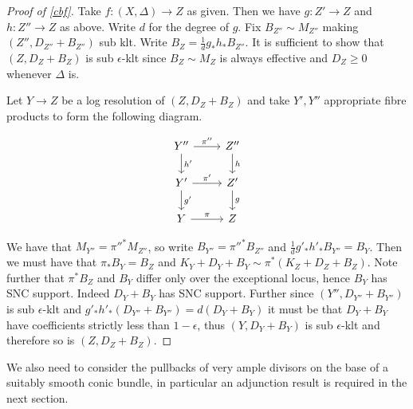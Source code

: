\begin{proof}[Proof of \autoref{cbf}]
	Take $f\colon (X,\Delta) \to Z$ as given. Then we have $g\colon Z' \to Z$ and $h\colon Z''\to Z$ as above. Write $d$ for the degree of $g$.
	Fix $B_{Z''}\sim M_{Z''}$ making $(Z'',D_{Z''}+B_{Z''})$ sub klt. Write $B_{Z}=\frac{1}{d}g_{*}h_{*}B_{Z''}$. It is sufficient to show that $(Z,D_{Z}+B_{Z})$ is sub $\epsilon$-klt since $B_{Z} \sim M_{Z}$ is always effective and $D_{Z} \geq 0$ whenever $\Delta$ is.
	
	Let $Y \to Z$ be a log resolution of $(Z,D_{Z}+B_{Z})$ and take $Y',Y''$ appropriate fibre products to form the following diagram.
	
	\[\begin{tikzcd}
	Y'' \arrow[r, "\pi''"] \arrow[d, "h'"] & Z'' \arrow[d, "h"] \\
	Y' \arrow[r, "\pi'"] \arrow[d, "g'"]   & Z' \arrow[d, "g"]  \\
	Y \arrow[r, "\pi"]                     & Z                 
	\end{tikzcd}\]
	
	
	We have that $M_{Y''}=\pi''^{*}M_{Z''}$, so write $B_{Y''}=\pi''^{*}B_{Z''}$ and $\frac{1}{d}g'_{*}h'_{*}B_{Y''}=B_{Y}$. Then we must have that $\pi_{*}B_{Y}=B_{Z}$ and $K_{Y}+D_{Y}+B_{Y}\sim \pi^{*}(K_{Z}+D_{Z}+B_{Z})$. Note further that $\pi^{*}B_{Z}$ and $B_{Y}$ differ only over the exceptional locus, hence $B_{Y}$ has SNC support. Indeed $D_{Y}+B_{Y}$ has SNC support. Further since $(Y'',D_{Y''}+B_{Y''})$ is sub $\epsilon$-klt and $g'_{*}h'_{*}(D_{Y''}+B_{Y''})=d(D_{Y}+B_{Y})$ it must be that $D_{Y}+B_{Y}$ have coefficients strictly less than $1-\epsilon$, thus $(Y,D_{Y}+B_{Y})$ is sub $\epsilon$-klt and therefore so is $(Z,D_{Z}+B_{Z})$.
\end{proof}
We also need to consider the pullbacks of very ample divisors on the base of a suitably smooth conic bundle, in particular an adjunction result is required in the next section.

